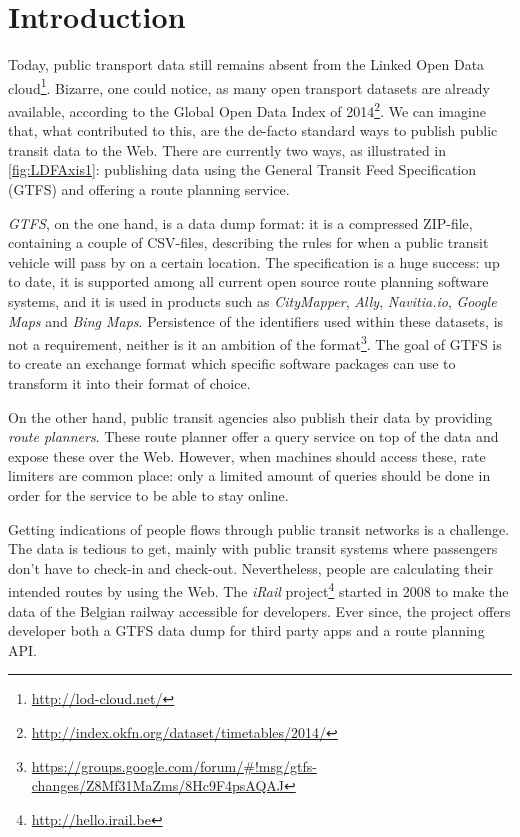 \documentclass{sig-alternate}
\begin{document}
\vspace{1em}

\section{Introduction}
\label{sec:introduction}

Today, public transport data still remains absent from the Linked Open Data cloud\footnote{\url{http://lod-cloud.net/}}.
Bizarre, one could notice, as many open transport datasets are already available, according to the Global Open Data Index of 2014\footnote{\url{http://index.okfn.org/dataset/timetables/2014/}}.
We can imagine that, what contributed to this, are the de-facto standard ways to publish public transit data to the Web.
There are currently two ways, as illustrated in \cref{fig:LDFAxis1}: publishing data using the General Transit Feed Specification (GTFS) and offering a route planning service.

\emph{GTFS}, on the one hand, is a data dump format: it is a compressed ZIP-file, containing a couple of CSV-files, describing the rules for when a public transit vehicle will pass by on a certain location.
The specification is a huge success: up to date, it is supported among all current open source route planning software systems, and it is used in products such as \emph{CityMapper}, \emph{Ally}, \emph{Navitia.io}, \emph{Google Maps} and \emph{Bing Maps}.
Persistence of the identifiers used within these datasets, is not a requirement, neither is it an ambition of the format\footnote{\url{https://groups.google.com/forum/#!msg/gtfs-changes/Z8Mf31MaZms/8Hc9F4psAQAJ}}.
The goal of GTFS is to create an exchange format which specific software packages can use to transform it into their format of choice.

On the other hand, public transit agencies also publish their data by providing \emph{route planners}.
These route planner offer a query service on top of the data and expose these over the Web.
However, when machines should access these, rate limiters are common place: only a limited amount of queries should be done in order for the service to be able to stay online.



Getting indications of people flows through public transit networks is a challenge.
The data is tedious to get, mainly with public transit systems where passengers don't have to check-in and check-out.
Nevertheless, people are calculating their intended routes by using the Web.
The \emph{iRail} project\footnote{\url{http://hello.irail.be}} started in 2008 to make the data of the Belgian railway accessible for developers.
Ever since, the project offers developer both a GTFS data dump for third party apps and a route planning API.
\end{document}
